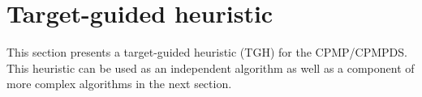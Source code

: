 \documentclass[review,3p,times,authoryear,12pt]{elsarticle}
\begin{document}
%
%
%
%
%
%
%

\section{Target-guided heuristic}
\label{sec:heu}

This section presents a target-guided heuristic (TGH) for the CPMP/CPMPDS.
This heuristic can be used as an independent algorithm as well as a component of more complex algorithms in the next section.
\end{document}
